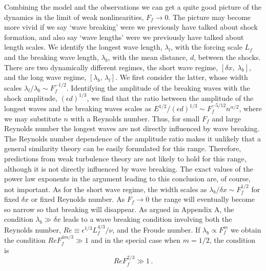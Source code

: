 Combining the model and the observations we can get a quite good picture of the
dynamics in the limit of weak nonlinearities, $ F_{f} \rightarrow 0 $. The
picture may become more vivid if we say `wave breaking' were we previously have
talked about shock formation, and also say `wave lengths' were we previously
have talked about length scales. We identify the longest wave length, $
\lambda_l $, with the forcing scale $ L_f $ and the breaking wave length, $
\lambda_b $, with the mean distance, $ d $, between the shocks. There are two
dynamically different regimes, the short wave regime, $ [\delta x, \;
\lambda_b] $, and the long wave regime, $ [\lambda_b, \, \lambda_l] $. We first
consider the latter, whose width scales $ \lambda_{l} /\lambda_b \sim
F_f^{-1/2} $. Identifying the amplitude of the breaking waves with the shock
amplitude, $ (\epsilon d)^{1/3} $, we find that the ratio between the amplitude of
the longest waves and the breaking waves scales as $ E^{1/2}/(\epsilon d)^{1/3}
\sim F_{f}^{-5/12} n^{\alpha/2} $, where we may substitute $ n $ with a
Reynolds number. Thus, for small $ F_f $ and large Reynolds
number the longest waves are not directly influenced by wave breaking. The
Reynolds number dependence of the amplitude ratio makes it unlikely that a
general similarity theory can be easily formulated for this range. Therefore,
predictions from weak turbulence theory \cite[for
example][]{ZakharovSagdeev1970} are not likely to hold for this range, although
it is not directly influenced by wave breaking. The exact values of the power
law exponents in the argument leading to this conclusion are, of course, not
important. As for the short wave regime, the width scales as $ \lambda_b
/\delta x \sim F_f^{1/2} $ for fixed $ \delta x $ or fixed Reynolds number. As
$ F_{f} \rightarrow 0 $ the range will eventually become so narrow so that
breaking will disappear. As argued in Appendix A, the condition $ \lambda_b \gg \delta x $ leads to a wave breaking condition involving both the Reynolds number,  $ Re  \equiv \epsilon^{1/3} L_f^{4/3} /  \nu $, and  the Froude number. If $ \lambda_b \propto F_f^{m} $ we obtain the condition $ Re F_f^{4m/3} \gg 1 $ and in the special case when $ m = 1/2 $, the condition is 
\begin{equation} \label{WC}
Re F_f^{2/3} \gg 1 \, .
\end{equation} 
